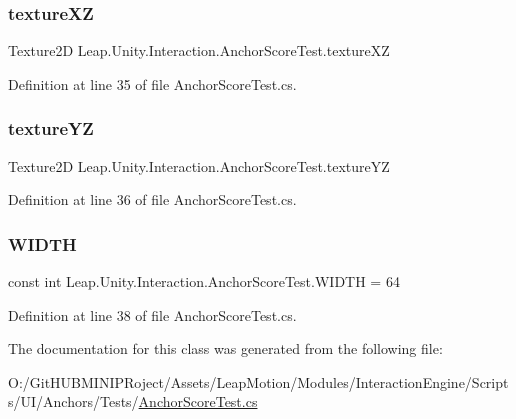 \subsubsection{\texorpdfstring{textureXZ}{textureXZ}}
{\footnotesize\ttfamily Texture2D Leap.\+Unity.\+Interaction.\+Anchor\+Score\+Test.\+texture\+XZ}



Definition at line 35 of file Anchor\+Score\+Test.\+cs.

\mbox{\label{class_leap_1_1_unity_1_1_interaction_1_1_anchor_score_test_acbb2721c96d37d8a95559ef9feb7111d}} 
\subsubsection{\texorpdfstring{textureYZ}{textureYZ}}
{\footnotesize\ttfamily Texture2D Leap.\+Unity.\+Interaction.\+Anchor\+Score\+Test.\+texture\+YZ}



Definition at line 36 of file Anchor\+Score\+Test.\+cs.

\mbox{\label{class_leap_1_1_unity_1_1_interaction_1_1_anchor_score_test_a3442a284019dc4cce6865e30272220ed}} 
\subsubsection{\texorpdfstring{WIDTH}{WIDTH}}
{\footnotesize\ttfamily const int Leap.\+Unity.\+Interaction.\+Anchor\+Score\+Test.\+W\+I\+D\+TH = 64}



Definition at line 38 of file Anchor\+Score\+Test.\+cs.



The documentation for this class was generated from the following file\+:\begin{DoxyCompactItemize}
\item 
O\+:/\+Git\+H\+U\+B\+M\+I\+N\+I\+P\+Roject/\+Assets/\+Leap\+Motion/\+Modules/\+Interaction\+Engine/\+Scripts/\+U\+I/\+Anchors/\+Tests/\mbox{\hyperlink{_anchor_score_test_8cs}{Anchor\+Score\+Test.\+cs}}\end{DoxyCompactItemize}
